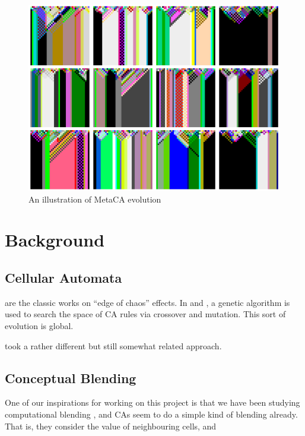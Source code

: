 \documentclass{AISB2008}
\begin{document}
\begin{figure}
\includegraphics[width=\columnwidth]{metaca.png}
\caption{An illustration of MetaCA evolution\label{metaca-taster}}
\end{figure}

\newpage

\section{Background}

\subsection{Cellular Automata}

\cite{langton1990computation,mitchell1993revisiting,packard1988adaptation}
are the classic works on ``edge of chaos'' effects.  In
\cite{mitchell1993revisiting} and \cite{packard1988adaptation},
a genetic algorithm is used to search the space of CA rules
via crossover and mutation.  This sort of evolution is global.

\cite{hofstadter1995prolegomena,marshall1999metacat} took a rather
different but still somewhat related approach.

\cite{goerg2012licors,goerg2012mixed}

\subsection{Conceptual Blending}

One of our inspirations for working on this project is that we have
been studying computational blending \cite{}, and CAs seem to do a
simple kind of blending already.  That is, they consider the value of
neighbouring cells, and 
\end{document}
